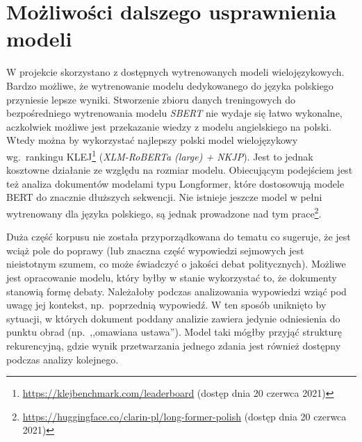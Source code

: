 	\section{Możliwości dalszego usprawnienia modeli}
		W projekcie skorzystano z dostępnych wytrenowanych modeli wielojęzykowych.
		Bardzo możliwe, że wytrenowanie modelu dedykowanego do języka polskiego przyniesie lepsze wyniki.
		Stworzenie zbioru danych treningowych do bezpośredniego wytrenowania modelu \emph{SBERT} nie wydaje się łatwo wykonalne,
			aczkolwiek możliwe jest przekazanie wiedzy z modelu angielskiego na polski.
		Wtedy można by wykorzystać najlepszy polski model wielojęzykowy wg.~rankingu KLEJ\footnote{\url{https://klejbenchmark.com/leaderboard} (dostęp dnia 20 czerwca 2021)} (\emph{XLM-RoBERTa (large) + NKJP}).
		Jest to jednak kosztowne działanie ze względu na rozmiar modelu.
		Obiecującym podejściem jest też analiza dokumentów modelami typu Longformer\cite{Longformer}, które dostosowują modele BERT do znacznie dłuższych sekwencji.
		Nie istnieje jeszcze model w pełni wytrenowany dla języka polskiego, są jednak prowadzone nad tym prace\footnote{\url{https://huggingface.co/clarin-pl/long-former-polish} (dostęp dnia 20 czerwca 2021)}. 

		Duża część korpusu nie została przyporządkowana do tematu co sugeruje, że jest wciąż pole do poprawy
			(lub znaczna część wypowiedzi sejmowych jest nieistotnym szumem, co może świadczyć o jakości debat politycznych).
		Możliwe jest opracowanie modelu, który byłby w stanie wykorzystać to, że dokumenty stanowią formę debaty.
		Należałoby podczas analizowania wypowiedzi wziąć pod uwagę jej kontekst, np.\ poprzednią wypowiedź.
		W ten sposób uniknięto by sytuacji, w których dokument poddany analizie zawiera jedynie odniesienia do punktu obrad (np.\ ,,omawiana ustawa'').
		Model taki mógłby przyjąć strukturę rekurencyjną, gdzie wynik przetwarzania jednego zdania jest również dostępny podczas analizy kolejnego.
		
